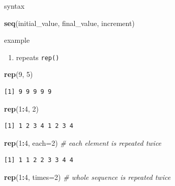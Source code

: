 \documentclass[]{book}
\newenvironment{Shaded}{\begin{snugshade}}{\end{snugshade}}
\newcommand{\CommentTok}[1]{\textcolor[rgb]{0.56,0.35,0.01}{\textit{#1}}}
\newcommand{\DataTypeTok}[1]{\textcolor[rgb]{0.13,0.29,0.53}{#1}}
\newcommand{\DecValTok}[1]{\textcolor[rgb]{0.00,0.00,0.81}{#1}}
\newcommand{\KeywordTok}[1]{\textcolor[rgb]{0.13,0.29,0.53}{\textbf{#1}}}
\newcommand{\NormalTok}[1]{#1}
\newcommand{\OperatorTok}[1]{\textcolor[rgb]{0.81,0.36,0.00}{\textbf{#1}}}
\providecommand{\tightlist}{%
  \setlength{\itemsep}{0pt}\setlength{\parskip}{0pt}}
\begin{document}
syntax

\begin{Shaded}
\begin{Highlighting}[]
\KeywordTok{seq}\NormalTok{(initial_value, final_value, increment)}
\end{Highlighting}
\end{Shaded}

example

\begin{enumerate}
\def\labelenumi{\arabic{enumi}.}
\setcounter{enumi}{2}
\tightlist
\item
  repeats \texttt{rep()}
\end{enumerate}

\begin{Shaded}
\begin{Highlighting}[]
\KeywordTok{rep}\NormalTok{(}\DecValTok{9}\NormalTok{, }\DecValTok{5}\NormalTok{)}
\end{Highlighting}
\end{Shaded}

\begin{verbatim}
[1] 9 9 9 9 9
\end{verbatim}

\begin{Shaded}
\begin{Highlighting}[]
\KeywordTok{rep}\NormalTok{(}\DecValTok{1}\OperatorTok{:}\DecValTok{4}\NormalTok{, }\DecValTok{2}\NormalTok{)}
\end{Highlighting}
\end{Shaded}

\begin{verbatim}
[1] 1 2 3 4 1 2 3 4
\end{verbatim}

\begin{Shaded}
\begin{Highlighting}[]
\KeywordTok{rep}\NormalTok{(}\DecValTok{1}\OperatorTok{:}\DecValTok{4}\NormalTok{, }\DataTypeTok{each=}\DecValTok{2}\NormalTok{) }\CommentTok{# each element is repeated twice}
\end{Highlighting}
\end{Shaded}

\begin{verbatim}
[1] 1 1 2 2 3 3 4 4
\end{verbatim}

\begin{Shaded}
\begin{Highlighting}[]
\KeywordTok{rep}\NormalTok{(}\DecValTok{1}\OperatorTok{:}\DecValTok{4}\NormalTok{, }\DataTypeTok{times=}\DecValTok{2}\NormalTok{) }\CommentTok{# whole sequence is repeated twice}
\end{Highlighting}
\end{Shaded}
\end{document}
